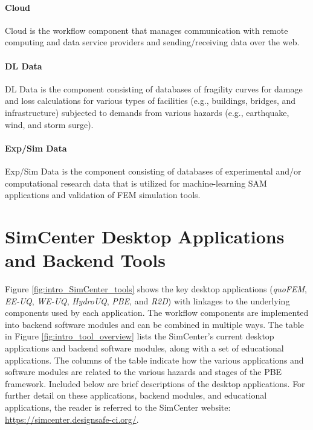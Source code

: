 \paragraph{Cloud} Cloud is the workflow component that manages communication with remote computing and data service providers and sending/receiving data over the web.

\paragraph{DL Data} DL Data is the component consisting of databases of fragility curves for damage and loss calculations for various types of facilities (e.g., buildings, bridges, and infrastructure) subjected to demands from various hazards (e.g., earthquake, wind, and storm surge).

\paragraph{Exp/Sim Data} Exp/Sim Data is the component consisting of databases of experimental and/or computational research data that is utilized for machine-learning SAM applications and validation of FEM simulation tools.

\section{SimCenter Desktop Applications and Backend Tools}

Figure \ref{fig:intro_SimCenter_tools} shows the key desktop applications (\emph{quoFEM}, \emph{EE-UQ}, \emph{WE-UQ}, \emph{HydroUQ}, \emph{PBE}, and \emph{R2D}) with linkages to the underlying components used by each application. The workflow components are implemented into backend software modules and can be combined in multiple ways.  The table in Figure \ref{fig:intro_tool_overview} lists the SimCenter’s current desktop applications and backend software modules, along with a set of educational applications.  The columns of the table indicate how the various applications and software modules are related to the various hazards and stages of the PBE framework. Included below are brief descriptions of the desktop applications.  For further detail on these applications, backend modules, and educational applications, the reader is referred to the SimCenter website: \url{https://simcenter.designsafe-ci.org/}. 

